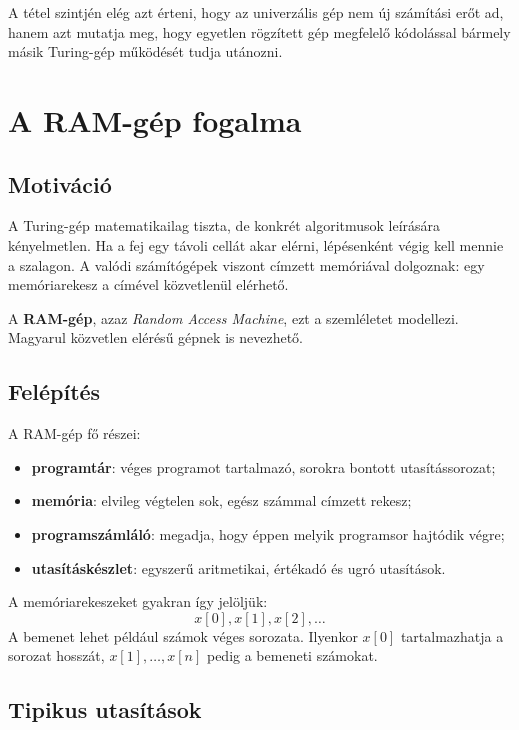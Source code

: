 A tétel szintjén elég azt érteni, hogy az univerzális gép nem új számítási erőt ad, hanem azt mutatja meg, hogy egyetlen rögzített gép megfelelő kódolással bármely másik Turing-gép működését tudja utánozni.

\section{A RAM-gép fogalma}

\subsection{Motiváció}

A Turing-gép matematikailag tiszta, de konkrét algoritmusok leírására kényelmetlen. Ha a fej egy távoli cellát akar elérni, lépésenként végig kell mennie a szalagon. A valódi számítógépek viszont címzett memóriával dolgoznak: egy memóriarekesz a címével közvetlenül elérhető.

A \textbf{RAM-gép}, azaz \emph{Random Access Machine}, ezt a szemléletet modellezi. Magyarul közvetlen elérésű gépnek is nevezhető.



\subsection{Felépítés}

A RAM-gép fő részei:

\begin{itemize}
  \item \textbf{programtár}: véges programot tartalmazó, sorokra bontott utasítássorozat;
  \item \textbf{memória}: elvileg végtelen sok, egész számmal címzett rekesz;
  \item \textbf{programszámláló}: megadja, hogy éppen melyik programsor hajtódik végre;
  \item \textbf{utasításkészlet}: egyszerű aritmetikai, értékadó és ugró utasítások.
\end{itemize}

A memóriarekeszeket gyakran így jelöljük:
\[
  x[0],x[1],x[2],\ldots
\]
A bemenet lehet például számok véges sorozata. Ilyenkor $x[0]$ tartalmazhatja a sorozat hosszát, $x[1],\ldots,x[n]$ pedig a bemeneti számokat.

\subsection{Tipikus utasítások}

